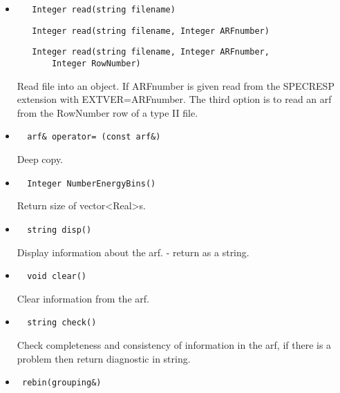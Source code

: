 \documentclass[11pt]{book}
\begin{document}
\begin{itemize}

\item  \begin{verbatim}   Integer read(string filename) \end{verbatim}
       \begin{verbatim}   Integer read(string filename, Integer ARFnumber) \end{verbatim}
       \begin{verbatim}   Integer read(string filename, Integer ARFnumber,
       Integer RowNumber) \end{verbatim}

          Read file into an object. If ARFnumber is given read from
          the SPECRESP extension with EXTVER=ARFnumber. The third
          option is to read an arf from the RowNumber row of a 
          type II file.

\item  \begin{verbatim}  arf& operator= (const arf&) \end{verbatim}

          Deep copy.

\item  \begin{verbatim}  Integer NumberEnergyBins() \end{verbatim}

          Return size of vector<Real>s.

\item  \begin{verbatim}  string disp() \end{verbatim}

          Display information about the arf. - return as a string.

\item  \begin{verbatim}  void clear() \end{verbatim}

          Clear information from the arf.

\item  \begin{verbatim}  string check() \end{verbatim}

          Check completeness and consistency of information in the arf,
          if there is a problem then return diagnostic in string.

\item    \begin{verbatim} rebin(grouping&) \end{verbatim}


\end{itemize}
\end{document}
